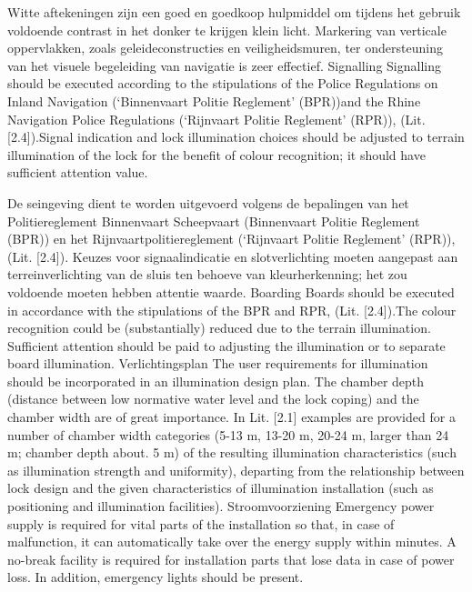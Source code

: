 Witte aftekeningen zijn een goed en goedkoop hulpmiddel om tijdens het gebruik voldoende contrast in het donker te krijgen
klein licht. Markering van verticale oppervlakken, zoals geleideconstructies en veiligheidsmuren, ter ondersteuning van het visuele
begeleiding van navigatie is zeer effectief.
Signalling
Signalling should be executed according to the stipulations of the Police Regulations on Inland
Navigation (‘Binnenvaart Politie Reglement’ (BPR))and the Rhine Navigation Police Regulations
(‘Rijnvaart Politie Reglement’ (RPR)), (Lit. [2.4]).Signal indication and lock illumination choices should be
adjusted to terrain illumination of the lock for the benefit of colour recognition; it should have sufficient
attention value.

De seingeving dient te worden uitgevoerd volgens de bepalingen van het Politiereglement Binnenvaart
Scheepvaart (Binnenvaart Politie Reglement (BPR)) en het Rijnvaartpolitiereglement
(‘Rijnvaart Politie Reglement’ (RPR)), (Lit. [2.4]). Keuzes voor signaalindicatie en slotverlichting moeten
aangepast aan terreinverlichting van de sluis ten behoeve van kleurherkenning; het zou voldoende moeten hebben
attentie waarde.
Boarding
Boards should be executed in accordance with the stipulations of the BPR and RPR, (Lit. [2.4]).The colour
recognition could be (substantially) reduced due to the terrain illumination. Sufficient attention should
be paid to adjusting the illumination or to separate board illumination.
Verlichtingsplan
The user requirements for illumination should be incorporated in an illumination design plan.
The chamber depth (distance between low normative water level and the lock coping) and the chamber
width are of great importance. In Lit. [2.1] examples are provided for a number of chamber width
categories (5-13 m, 13-20 m, 20-24 m, larger than 24 m; chamber depth about. 5 m) of the resulting
illumination characteristics (such as illumination strength and uniformity), departing from the relationship
between lock design and the given characteristics of illumination installation (such as positioning
and illumination facilities).
\newline \indent Stroomvoorziening
Emergency power supply is required for vital parts of the installation so that, in case of malfunction,
it can automatically take over the energy supply within minutes. A no-break facility is required for
installation parts that lose data in case of power loss. In addition, emergency lights should be present.

